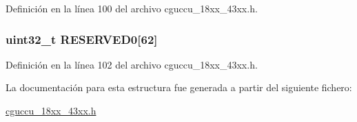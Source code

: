 Definición en la línea 100 del archivo cguccu\+\_\+18xx\+\_\+43xx.\+h.

\subsubsection[{\texorpdfstring{R\+E\+S\+E\+R\+V\+E\+D0}{RESERVED0}}]{ uint32\+\_\+t R\+E\+S\+E\+R\+V\+E\+D0\mbox{[}62\mbox{]}}\hypertarget{struct_l_p_c___c_c_u2___t_af715d3356c6e2bd831a1862864ef1a7e}{}\label{struct_l_p_c___c_c_u2___t_af715d3356c6e2bd831a1862864ef1a7e}


Definición en la línea 102 del archivo cguccu\+\_\+18xx\+\_\+43xx.\+h.



La documentación para esta estructura fue generada a partir del siguiente fichero\+:\begin{DoxyCompactItemize}
\item 
\hyperlink{cguccu__18xx__43xx_8h}{cguccu\+\_\+18xx\+\_\+43xx.\+h}\end{DoxyCompactItemize}
